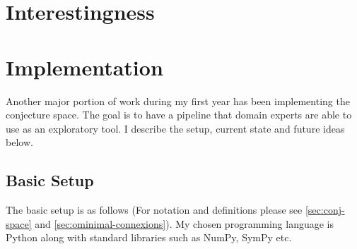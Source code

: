 \section{Interestingness}

\section{Implementation}
\label{sec:implementation}
Another major portion of work during my first year has been implementing the conjecture space. The goal is to have a pipeline that domain experts are able to use as an exploratory tool.
I describe the setup, current state and future ideas below.

\subsection{Basic Setup}
The basic setup is as follows (For notation and definitions please see \ref{sec:conj-space} and \ref{sec:ominimal-connexions}). My chosen programming language is Python along with standard libraries such as NumPy, SymPy etc. 
